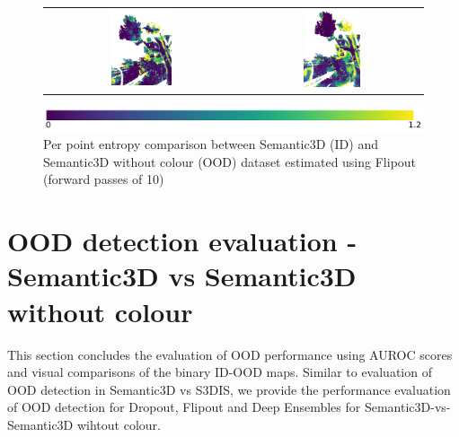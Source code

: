 \begin{figure}[h!]
\begin{tabular}{cc}
            \includegraphics[width=0.33\textwidth, height=0.22\textheight]{images/ood_imgs/fout_sem3d/fout_ent_3.pdf}&
            \includegraphics[width=0.33\textwidth, height=0.22\textheight]{images/sem3d_of/fout_ent_sem3d_of_3.pdf}\\
        \end{tabular}
        \includegraphics[scale=0.45]{images/ent_legend.pdf}
        \caption{Per point entropy comparison between Semantic3D (ID) and Semantic3D without colour (OOD) dataset estimated using Flipout (forward passes of 10)}
        \label{fig:fout_entmap_vis_sem3d_OF}
    \end{figure} 
    \FloatBarrier


    \section{OOD detection evaluation -  Semantic3D vs Semantic3D without colour}
    This section concludes the evaluation of OOD performance using AUROC scores and visual comparisons of the binary ID-OOD maps.
    Similar to evaluation of OOD detection in Semantic3D vs S3DIS, we provide the performance evaluation of OOD detection for Dropout, Flipout and Deep Ensembles for Semantic3D-vs-Semantic3D wihtout colour.
    
